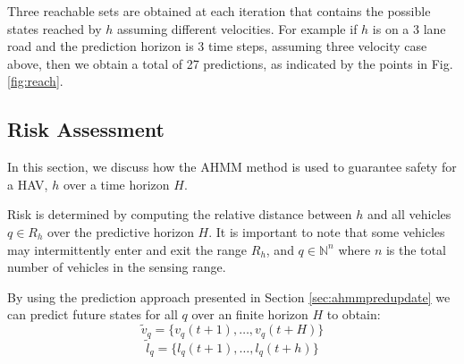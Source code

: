 \documentclass[letterpaper, 10 pt, conference]{ieeeconf}  %
\newcommand\NB[1]{$\spadesuit$\footnote{NB: #1}}
\newcommand\RP[1]{$\clubsuit$\footnote{RP: #1}}
\begin{document}
Three reachable sets are obtained at each iteration that contains the possible states reached by $h$ assuming different velocities. For example if $h$ is on a 3 lane road and the prediction horizon is 3 time steps, assuming three velocity case above, then we obtain a total of 27 predictions, as indicated by the points in Fig. \ref{fig:reach}.

\subsection{Risk Assessment}

 In this section, we discuss how the AHMM method is used to guarantee safety for a HAV, $h$ over a time horizon $H$. 
 
 
 Risk is determined by computing the relative distance between $h$ and all vehicles $q\in R_h$ over the predictive horizon $H$. It is important to note that some vehicles may intermittently enter and exit the range $R_h$, and $q\in\mathbb{N}^n$
where $n$ is the total number of vehicles in the sensing range.


By using the prediction approach presented in Section \ref{sec:ahmmpredupdate} we can predict future states for all $q$ over an finite horizon $H$ to obtain:
\begin{equation}
    \tilde{v}_q = \{v_q(t+1),\ldots,v_q(t+H)\}
\end{equation}
\begin{equation}
    \tilde{l}_q = \{l_q(t+1),\ldots,l_q(t+h)\}
\end{equation}

\end{document}
